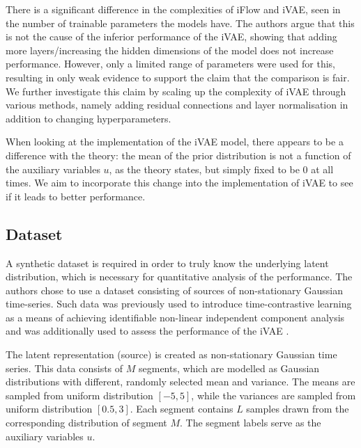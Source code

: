 There is a significant difference in the complexities of iFlow and iVAE, seen in the number of trainable parameters the models have. The authors argue that this is not the cause of the inferior performance of the iVAE, showing that adding more layers/increasing the hidden dimensions of the model does not increase performance. However, only a limited range of parameters were used for this, resulting in only weak evidence to support the claim that the comparison is fair.
We further investigate this claim by scaling up the complexity of iVAE through various methods, namely adding residual connections and layer normalisation in addition to changing hyperparameters.

When looking at the implementation of the iVAE model, there appears to be a difference with the theory: the mean of the prior distribution is not a function of the auxiliary variables $u$, as the theory states, but simply fixed to be 0 at all times. We aim to incorporate this change into the implementation of iVAE to see if it leads to better performance.

\subsection{Dataset}
A synthetic dataset is required in order to truly know the underlying latent distribution, which is necessary for quantitative analysis of the performance.
The authors chose to use a dataset consisting of sources of non-stationary Gaussian time-series. Such data was previously used to introduce time-contrastive learning as a means of achieving identifiable non-linear independent component analysis \cite{hyvarinen2016unsupervised} and was additionally used to assess the performance of the iVAE \cite{khemakhem2020variational}.

The latent representation (source) is created as non-stationary Gaussian time series. This data consists of $M$ segments, which are modelled as Gaussian distributions with different, randomly selected mean and variance. The means are sampled from uniform distribution $[-5,5]$, while the variances are sampled from uniform distribution $[0.5,3]$.
Each segment contains $L$ samples drawn from the corresponding distribution of segment $M$. The segment labels serve as the auxiliary variables $u$.

